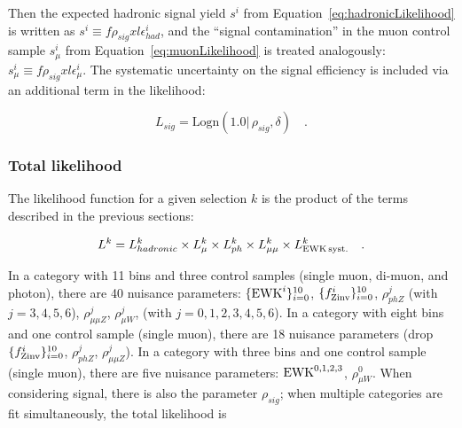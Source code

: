 Then the expected hadronic signal yield $s^i$ from
Equation~\ref{eq:hadronicLikelihood} is written as $s^i \equiv
f\rho_{sig} xl\epsilon_{had}^i$, and the ``signal contamination'' in
the muon control sample $s_{\mu}^i$ from
Equation~\ref{eq:muonLikelihood} is treated analogously: $s_{\mu}^i
\equiv f\rho_{sig} xl\epsilon_{\mu}^i$.  The systematic uncertainty on
the signal efficiency is included via an additional term in the
likelihood:

\begin{equation}
L_{sig}=\mathrm{Logn}(1.0 |\,\rho_{sig}, \delta) \quad .
\end{equation}

\subsubsection{Total likelihood}
\label{sec:totalLikelihood}

The likelihood function for a given selection $k$ is the product of
the terms described in the previous sections:

\begin{equation}
L^k = L_{hadronic}^k \times L_{\mu}^k \times L_{ph}^k \times
L_{\mu\mu}^k\times L_{\rm EWK\, syst.}^k \quad .
\end{equation}

In a category with 11 \HT bins and three control samples (single muon,
di-muon, and photon), there are 40 nuisance parameters:
$\{\ewk^{i}\}_{i=0}^{10}$, $\{\fZinv{i}\}_{i=0}^{10}$, $\rho_{phZ}^j$
(with $j=3,4,5,6$), $\rho_{\mu\mu Z}^j$, $\rho_{\mu W}^j$, (with
$j=0,1,2,3,4,5,6$).  In a category with eight \HT bins and one control
sample (single muon), there are 18 nuisance parameters (drop
$\{\fZinv{i}\}_{i=0}^{10}$, $\rho_{phZ}^j$, $\rho_{\mu\mu Z}^j$).  In
a category with three \HT bins and one control sample (single muon),
there are five nuisance parameters: $\ewk^{0,1,2,3}$, $\rho_{\mu
  W}^0$.  When considering signal, there is also the parameter
$\rho_{sig}$; when multiple categories are fit simultaneously, the
total likelihood is



